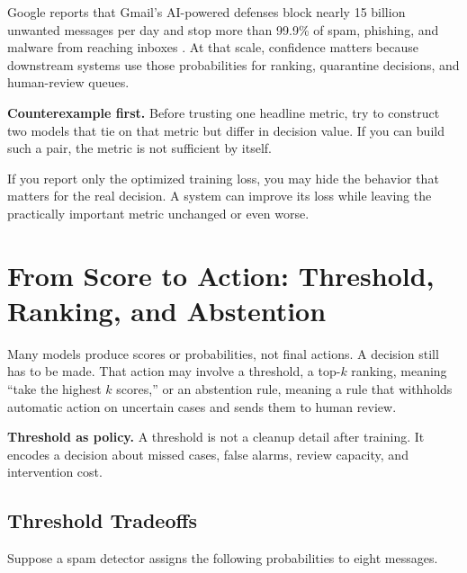 \begin{example}
Google reports that Gmail's AI-powered defenses block nearly 15 billion unwanted messages per day and stop more than 99.9\% of spam, phishing, and malware from reaching inboxes \citep{gmail2023}. At that scale, confidence matters because downstream systems use those probabilities for ranking, quarantine decisions, and human-review queues.
\end{example}

\begin{thinkingtool}
\textbf{Counterexample first.} Before trusting one headline metric, try to construct two models that tie on that metric but differ in decision value. If you can build such a pair, the metric is not sufficient by itself.
\end{thinkingtool}

\begin{warningbox}
If you report only the optimized training loss, you may hide the behavior that matters for the real decision. A system can improve its loss while leaving the practically important metric unchanged or even worse.
\end{warningbox}

\section{From Score to Action: Threshold, Ranking, and Abstention}

Many models produce scores or probabilities, not final actions. A decision still has to be made. That action may involve a threshold, a top-$k$ ranking, meaning ``take the highest $k$ scores,'' or an abstention rule, meaning a rule that withholds automatic action on uncertain cases and sends them to human review.

\begin{thinkingtool}
\textbf{Threshold as policy.} A threshold is not a cleanup detail after training. It encodes a decision about missed cases, false alarms, review capacity, and intervention cost.
\end{thinkingtool}

\subsection{Threshold Tradeoffs}

Suppose a spam detector assigns the following probabilities to eight messages.

